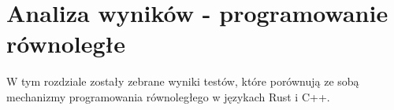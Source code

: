 \chapter{Analiza wyników - programowanie równoległe}
W tym rozdziale zostały zebrane wyniki testów, które porównują ze sobą mechanizmy programowania równoległego w językach Rust i C++.
\nopagebreak

